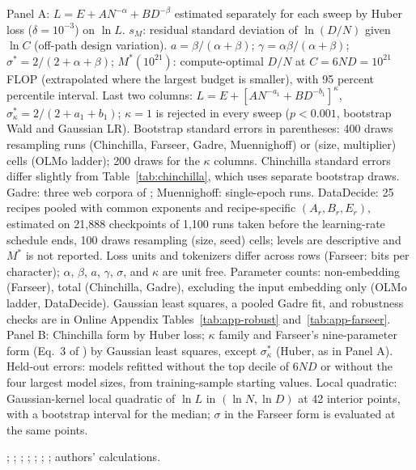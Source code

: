 \begin{table}[tp]
\begin{tablenotes}
Panel A: $L=E+AN^{-\alpha}+BD^{-\beta}$ estimated separately for each sweep by Huber loss ($\delta=10^{-3}$) on
$\ln L$. $s_M$: residual standard deviation of $\ln(D/N)$ given $\ln C$ (off-path design variation).
$a=\beta/(\alpha+\beta)$; $\gamma=\alpha\beta/(\alpha+\beta)$; $\sigma^*=2/(2+\alpha+\beta)$; $M^*(10^{21})$:
compute-optimal $D/N$ at $C=6ND=10^{21}$ FLOP (extrapolated where the largest budget is smaller), with 95 percent
percentile interval. Last two columns: $L=E+[AN^{-a_1}+BD^{-b_1}]^{\kappa}$, $\sigma^*_\kappa=2/(2+a_1+b_1)$;
$\kappa=1$ is rejected in every sweep ($p<0.001$, bootstrap Wald and Gaussian LR). Bootstrap standard errors in
parentheses: 400 draws resampling runs (Chinchilla, Farseer, Gadre, Muennighoff) or (size, multiplier) cells (OLMo
ladder); 200 draws for the $\kappa$ columns. Chinchilla standard errors differ slightly from Table~\ref{tab:chinchilla},
which uses separate bootstrap draws. Gadre: three web corpora of \citet{gadre2024language}; Muennighoff: single-epoch runs. DataDecide: 25 recipes pooled with common exponents and recipe-specific
$(A_r,B_r,E_r)$, estimated on 21,888 checkpoints of 1,100 runs taken before the learning-rate schedule ends, 100
draws resampling (size, seed) cells; levels are descriptive and $M^*$ is not reported. Loss units and tokenizers
differ across rows (Farseer: bits per character); $\alpha$, $\beta$, $a$, $\gamma$, $\sigma$, and $\kappa$ are unit
free. Parameter counts: non-embedding (Farseer), total (Chinchilla, Gadre), excluding the input embedding only (OLMo
ladder, DataDecide). Gaussian least squares, a pooled Gadre fit, and robustness checks are in Online Appendix Tables~\ref{tab:app-robust} and~\ref{tab:app-farseer}.
Panel B: Chinchilla form by Huber loss; $\kappa$ family and Farseer's nine-parameter form (Eq.~3 of
\citealt{li2025predictableb}) by Gaussian least squares, except $\sigma^*_\kappa$ (Huber, as in Panel A). Held-out
errors: models refitted without the top decile of $6ND$ or without the four largest model sizes, from
training-sample starting values. Local quadratic: Gaussian-kernel local quadratic of $\ln L$ in $(\ln N,\ln D)$ at 42
interior points, with a bootstrap interval for the median; $\sigma$ in the Farseer form is evaluated at the same
points.
\end{tablenotes}

\begin{tablenotes}[Source]
\citet{hoffmann2022training}; \citet{besiroglu2024chinchilla}; \citet{li2025predictableb}; \citet{gadre2024language};
\citet{bhagia2024establishing}; \citet{muennighoff2023scaling}; \citet{magnusson2025datadecide}; authors' calculations.
\end{tablenotes}
\end{table}
